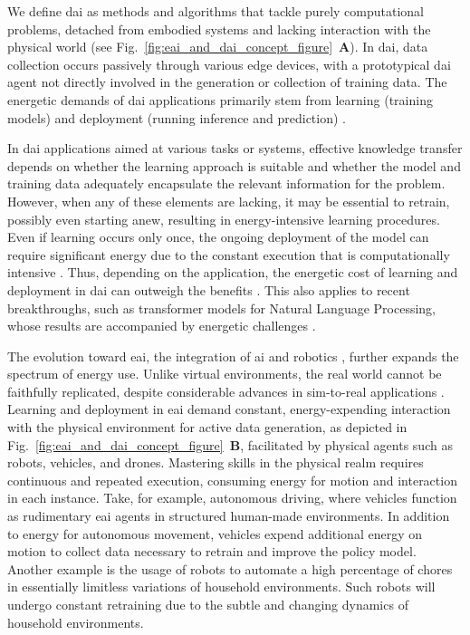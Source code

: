 \documentclass[12pt]{article}
\begin{document}
We define \ac{dai} as methods and algorithms that tackle purely computational problems, detached from embodied systems and lacking interaction with the physical world (see Fig.~\ref{fig:eai_and_dai_concept_figure}~\textbf{A}). In \ac{dai}, data collection occurs passively through various edge devices, with a prototypical \ac{dai} agent not directly involved in the generation or collection of training data. The energetic demands of \ac{dai} applications primarily stem from learning (training models) and deployment (running inference and prediction) \cite{Vries2023growingenergyfootprint}.

In \ac{dai} applications aimed at various tasks or systems, effective knowledge transfer depends on whether the learning approach is suitable and whether the model and training data adequately encapsulate the relevant information for the problem. However, when any of these elements are lacking, it may be essential to retrain, possibly even starting anew, resulting in energy-intensive learning procedures. Even if learning occurs only once, the ongoing deployment of the model can require significant energy due to the constant execution that is computationally intensive \cite{Vries2023growingenergyfootprint}. Thus, depending on the application, the energetic cost of learning and deployment in \ac{dai} can outweigh the benefits \cite{Strubell2019EnergyPolicyConsiderations}. This also applies to recent breakthroughs, such as transformer models for Natural Language Processing, whose results are accompanied by energetic challenges \cite{Cao2020TowardsAccurateReliable}.

The evolution toward \ac{eai}, the integration of \ac{ai} and robotics \cite{Pfeifer2004Embodiedartificialintelligence}, further expands the spectrum of energy use. Unlike virtual environments, the real world cannot be faithfully replicated, despite considerable advances in sim-to-real applications \cite{Chebotar2019Closingsimreal}. Learning and deployment in \ac{eai} demand constant, energy-expending interaction with the physical environment for active data generation, as depicted in Fig.~\ref{fig:eai_and_dai_concept_figure}~\textbf{B}, facilitated by physical agents such as robots, vehicles, and drones. Mastering skills in the physical realm requires continuous and repeated execution, consuming energy for motion and interaction in each instance. Take, for example, autonomous driving, where vehicles function as rudimentary \ac{eai} agents in structured human-made environments. In addition to energy for autonomous movement, vehicles expend additional energy on motion to collect data necessary to retrain and improve the policy model. Another example is the usage of robots to automate a high percentage of chores in essentially limitless variations of household environments\cite{Lehdonvirta2022futuresunpaidwork}. Such robots will undergo constant retraining due to the subtle and changing dynamics of household environments.
\end{document}
